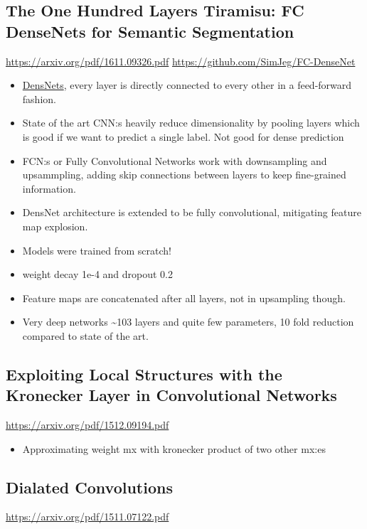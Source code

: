 \documentclass[11pt]{article}
\begin{document}
\subsection{The One Hundred Layers Tiramisu: FC DenseNets for Semantic Segmentation}
\label{sec:org3e9162b}
\url{https://arxiv.org/pdf/1611.09326.pdf}
\url{https://github.com/SimJeg/FC-DenseNet}

\begin{itemize}
\item \href{https://arxiv.org/pdf/1608.06993.pdf}{DensNets}, every layer is directly connected to every other in a feed-forward fashion.
\item State of the art CNN:s heavily reduce dimensionality by pooling layers which is good if we want to predict a single label. Not good for dense prediction
\item FCN:s or Fully Convolutional Networks work with downsampling and upsammpling, adding skip connections between layers to keep fine-grained information.
\item DensNet architecture is extended to be fully convolutional, mitigating feature map explosion.
\item Models were trained from scratch!
\item weight decay 1e-4 and dropout 0.2
\item Feature maps are concatenated after all layers, not in upsampling though.
\item Very deep networks \textasciitilde{}103 layers and quite few parameters, 10 fold reduction compared to state of the art.
\end{itemize}

\subsection{Exploiting Local Structures with the Kronecker Layer in Convolutional Networks}
\label{sec:org304983c}
\url{https://arxiv.org/pdf/1512.09194.pdf}

\begin{itemize}
\item Approximating weight mx with kronecker product of two other mx:es
\end{itemize}

\subsection{Dialated Convolutions}
\label{sec:org55a1cb5}
\url{https://arxiv.org/pdf/1511.07122.pdf}
\end{document}
